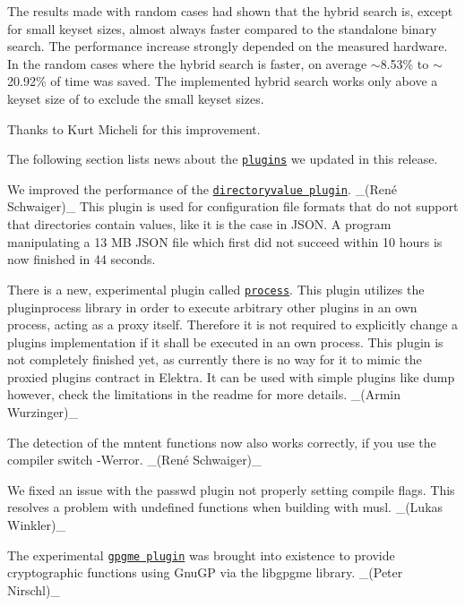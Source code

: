 The results made with random cases had shown that the hybrid search is, except for small keyset sizes, almost always faster compared to the standalone binary search. The performance increase strongly depended on the measured hardware. In the random cases where the hybrid search is faster, on average $\sim$8.53\% to $\sim$20.92\% of time was saved. The implemented hybrid search works only above a keyset size of {} to exclude the small keyset sizes.

Thanks to Kurt Micheli for this improvement.

The following section lists news about the \href{https://www.libelektra.org/plugins/readme}{\tt plugins} we updated in this release.

We improved the performance of the \href{https://libelektra.org/plugins/directoryvalue}{\tt directoryvalue plugin}. \+\_\+(René Schwaiger)\+\_\+ This plugin is used for configuration file formats that do not support that directories contain values, like it is the case in J\+S\+ON. A program manipulating a 13 MB J\+S\+ON file which first did not succeed within 10 hours is now finished in 44 seconds.

There is a new, experimental plugin called \href{https://libelektra.org/plugins/process}{\tt process}. This plugin utilizes the pluginprocess library in order to execute arbitrary other plugins in an own process, acting as a proxy itself. Therefore it is not required to explicitly change a plugin\textquotesingle{}s implementation if it shall be executed in an own process. This plugin is not completely finished yet, as currently there is no way for it to mimic the proxied plugin\textquotesingle{}s contract in Elektra. It can be used with simple plugins like {\ttfamily dump} however, check the limitations in the readme for more details. \+\_\+(\+Armin Wurzinger)\+\_\+

The detection of the {\ttfamily mntent} functions now also works correctly, if you use the compiler switch {\ttfamily -\/\+Werror}. \+\_\+(René Schwaiger)\+\_\+

We fixed an issue with the passwd plugin not properly setting compile flags. This resolves a problem with undefined functions when building with musl. \+\_\+(\+Lukas Winkler)\+\_\+

The experimental \href{https://libelektra.org/plugins/gpgme}{\tt gpgme plugin} was brought into existence to provide cryptographic functions using Gnu\+GP via the {\ttfamily libgpgme} library. \+\_\+(\+Peter Nirschl)\+\_\+

